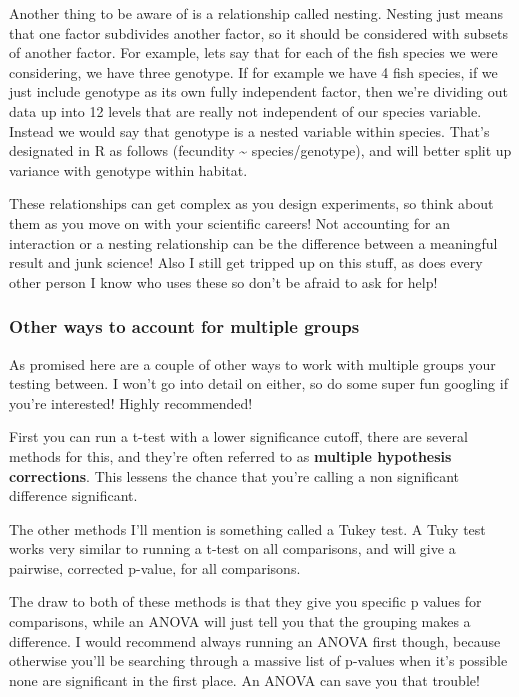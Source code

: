 \documentclass[
]{article}
\begin{document}
Another thing to be aware of is a relationship called nesting. Nesting
just means that one factor subdivides another factor, so it should be
considered with subsets of another factor. For example, lets say that
for each of the fish species we were considering, we have three
genotype. If for example we have 4 fish species, if we just include
genotype as its own fully independent factor, then we're dividing out
data up into 12 levels that are really not independent of our species
variable. Instead we would say that genotype is a nested variable within
species. That's designated in R as follows (fecundity \textasciitilde{}
species/genotype), and will better split up variance with genotype
within habitat.

These relationships can get complex as you design experiments, so think
about them as you move on with your scientific careers! Not accounting
for an interaction or a nesting relationship can be the difference
between a meaningful result and junk science! Also I still get tripped
up on this stuff, as does every other person I know who uses these so
don't be afraid to ask for help!

\hypertarget{other-ways-to-account-for-multiple-groups}{%
\subsubsection{Other ways to account for multiple
groups}\label{other-ways-to-account-for-multiple-groups}}

As promised here are a couple of other ways to work with multiple groups
your testing between. I won't go into detail on either, so do some super
fun googling if you're interested! Highly recommended!

First you can run a t-test with a lower significance cutoff, there are
several methods for this, and they're often referred to as
\textbf{multiple hypothesis corrections}. This lessens the chance that
you're calling a non significant difference significant.

The other methods I'll mention is something called a Tukey test. A Tuky
test works very similar to running a t-test on all comparisons, and will
give a pairwise, corrected p-value, for all comparisons.

The draw to both of these methods is that they give you specific p
values for comparisons, while an ANOVA will just tell you that the
grouping makes a difference. I would recommend always running an ANOVA
first though, because otherwise you'll be searching through a massive
list of p-values when it's possible none are significant in the first
place. An ANOVA can save you that trouble!
\end{document}
